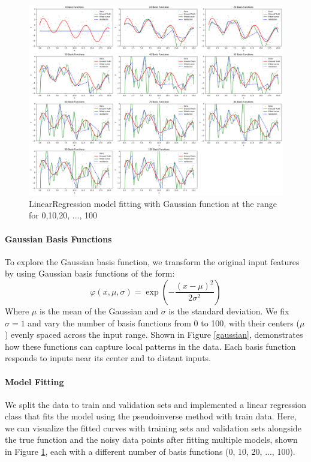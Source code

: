 \documentclass{article}
\begin{document}
\begin{figure}[H]
    \centering
    \includegraphics[width=0.95\linewidth,height=0.3\textheight]{figures/gaussian_data.png} 
    \caption{LinearRegression model fitting with Gaussian function at the range for 0,10,20, ..., 100}
    \label{gaussian data}
\end{figure}

\paragraph{Gaussian Basis Functions}
To explore the Gaussian basis function, we transform the original input features by using Gaussian basis functions of the form:
\[
\varphi(x, \mu, \sigma) = \exp\left(-\frac{(x - \mu)^2}{2\sigma^2}\right)
\]
Where $\mu$ is the mean of the Gaussian and $\sigma$ is the standard deviation. We fix $\sigma = 1$ and vary the number of basis functions from 0 to 100, with their centers ($\mu$) evenly spaced across the input range. Shown in Figure \ref{gaussian}, demonstrates how these functions can capture local patterns in the data. Each basis function responds to inputs near its center and to distant inputs.

\paragraph{Model Fitting}
We split the data to train and validation sets and implemented a linear regression class that fits the model using the pseudoinverse method with train data. Here, we can visualize the fitted curves with training sets and validation sets alongside the true function and the noisy data points after fitting multiple models, shown in Figure \ref{gaussian data}, each with a different number of basis functions (0, 10, 20, ..., 100).
\end{document}
